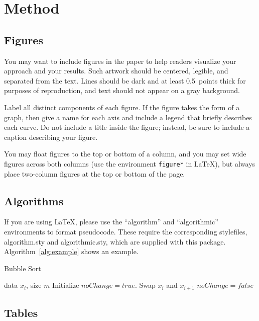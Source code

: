\documentclass{article}
\begin{document}
\section{Method} 

\subsection{Figures}
 
You may want to include figures in the paper to help readers visualize
your approach and your results. Such artwork should be centered,
legible, and separated from the text. Lines should be dark and at
least 0.5~points thick for purposes of reproduction, and text should
not appear on a gray background.

Label all distinct components of each figure. If the figure takes the
form of a graph, then give a name for each axis and include a legend
that briefly describes each curve. Do not include a title inside the
figure; instead, be sure to include a caption describing your figure.

You may float figures to the top or
bottom of a column, and you may set wide figures across both columns
(use the environment {\tt figure*} in \LaTeX), but always place
two-column figures at the top or bottom of the page.

\subsection{Algorithms}

If you are using \LaTeX, please use the ``algorithm'' and ``algorithmic'' 
environments to format pseudocode. These require 
the corresponding stylefiles, algorithm.sty and 
algorithmic.sty, which are supplied with this package. 
Algorithm~\ref{alg:example} shows an example. 

\begin{algorithm}[tb]
   \caption{Bubble Sort}
   \label{alg:example}
\begin{algorithmic}
    data $x_i$, size $m$
   \REPEAT
   \STATE Initialize $noChange = true$.
   \STATE Swap $x_i$ and $x_{i+1}$
   \STATE $noChange = false$
   \ENDIF
   \ENDFOR
\end{algorithmic}
\end{algorithm}
 
\subsection{Tables} 
 
\end{document}
